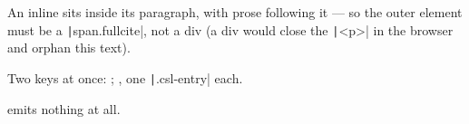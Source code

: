 An inline  sits inside its paragraph, with prose
following it — so the outer element must be a \texttt|span.fullcite|, not a div
(a div would close the \texttt|<p>| in the browser and orphan this text).

Two keys at once: ; , one \texttt|.csl-entry| each.

 emits nothing at all.


\renewcommand{\refname}{References}


